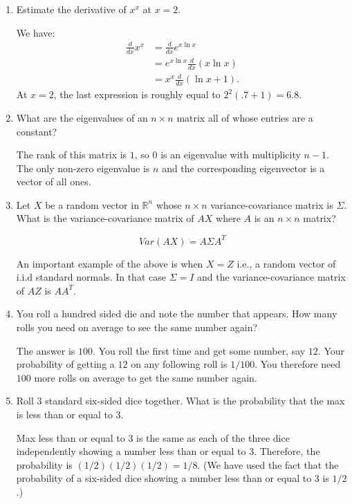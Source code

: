\documentclass{amsart}
\theoremstyle{plain}
\numberwithin{equation}{section}
\begin{document}
\begin{enumerate}
\item Estimate the derivative of $x^x$ at $x=2$.

We have:
\begin{align*}
\frac{d}{dx}x^x &= \frac{d}{dx} e^{ x\ln x} \\
&= e^{x \ln x }\frac{d}{dx}(x \ln x)\\
&= x^{x}\frac{d}{dx}(\ln x + 1 ).
\end{align*}
At $x=2$, the last expression is roughly equal to
$2^2(.7 + 1 )=6.8$.
\item What are the eigenvalues of an $n \times n$
 matrix all of whose entries are a constant?

The rank of this matrix is $1$, so $0$ is an eigenvalue
with multiplicity $n-1$. The only non-zero eigenvalue
is $n$ and the corresponding eigenvector is 
a vector of all ones. 

\item Let $X$ be a random vector in $\mathbb{R}^n$ whose
$n \times n$ variance-covariance 
matrix is $\Sigma$. What is the variance-covariance matrix of 
$AX$ where $A$ is an $n \times n$ matrix?

\begin{equation*}
Var(AX) = A \Sigma A^{T}
\end{equation*}

An important example of the above is when $X=Z$ i.e.,
a random vector of i.i.d standard normals. In that case
$\Sigma = I$ and the variance-covariance matrix 
of $AZ$ is $AA^T$.

\item You roll a hundred sided die and note the number 
that appears. How many rolls you need on average 
to see the same number again?

The answer is $100$. You roll the first time and get 
some number, say $12$. Your probability of getting a $12$
on any following roll is $1/100$. You therefore need
$100$ more rolls on average to get the same number again. 

\item Roll $3$ standard six-sided dice together. What is the 
probability that the max is less than or equal to $3$.

Max less than or equal to $3$ is the same as each of the 
three dice independently showing a number less than or equal to $3$. 
Therefore, the probability is $(1/2)(1/2)(1/2) = 1/8$. (We have used the fact
that the probability of a six-sided dice showing a 
number less than or equal to $3$ is $1/2$.)


\end{enumerate}
\end{document}
